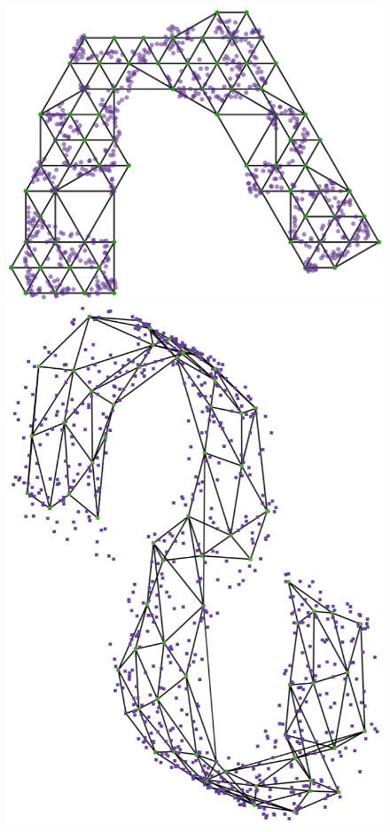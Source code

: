 \documentclass[
  12pt]{article}
\begin{document}
\begin{figure}[H]

\begin{minipage}{0.25\linewidth}
\includegraphics{figures/scurve/tsne_trimesh_layout.png}\end{minipage}%
%
\begin{minipage}{0.25\linewidth}
\includegraphics{figures/scurve/sc_tsne_best_1.png}\end{minipage}%

\end{figure}
\end{document}
